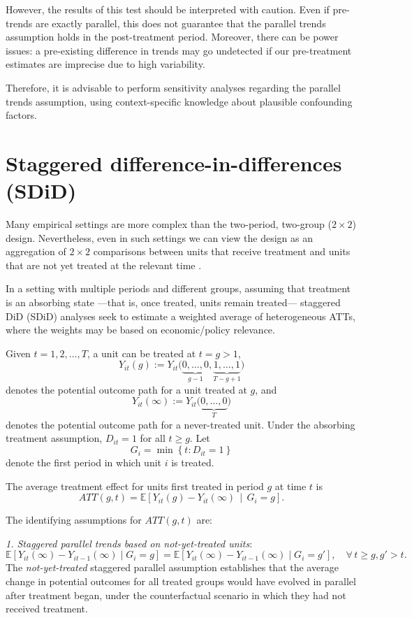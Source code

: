 However, the results of this test should be interpreted with caution. Even if pre-trends are exactly parallel, this does not guarantee that the parallel trends assumption holds in the post-treatment period. Moreover, there can be power issues: a pre-existing difference in trends may go undetected if our pre-treatment estimates are imprecise due to high variability.
  
Therefore, it is advisable to perform sensitivity analyses regarding the parallel trends assumption, using context-specific knowledge about plausible confounding factors.

\section{Staggered difference-in-differences (SDiD)}\label{chap12_6}
Many empirical settings are more complex than the two-period, two-group ($2\times 2$) design. Nevertheless, even in such settings we can view the design as an aggregation of $2\times 2$ comparisons between units that receive treatment and units that are not yet treated at the relevant time \cite{baker2025did_guide}.

In a setting with multiple periods and different groups, assuming that treatment is an absorbing state —that is, once treated, units remain treated— staggered DiD (SDiD) analyses seek to estimate a weighted average of heterogeneous ATTs, where the weights may be based on economic/policy relevance. 

Given $t = 1, 2, \dots, T$, a unit can be treated at $t = g > 1$,  
\[
Y_{it}(g) := Y_{it}\big(\underbrace{0, \dots, 0}_{g-1}, \underbrace{1, \dots, 1}_{T-g+1}\big)
\]
denotes the potential outcome path for a unit treated at $g$, and
\[
Y_{it}(\infty) := Y_{it}\big(\underbrace{0, \dots, 0}_{T}\big)
\]
denotes the potential outcome path for a never-treated unit.  
Under the absorbing treatment assumption, $D_{it} = 1$ for all $t \geq g$. Let
\[
G_i = \min\left\{ t : D_{it} = 1 \right\}
\]
denote the first period in which unit $i$ is treated.

The average treatment effect for units first treated in period $g$ at time $t$ is
\[
ATT(g,t) = \mathbb{E}\left[ Y_{it}(g) - Y_{it}(\infty) \,\middle|\, G_i = g \right].
\]

The identifying assumptions for $ATT(g,t)$ are:

\textit{1. Staggered parallel trends based on not-yet-treated units}:
\begin{equation}
	\mathbb{E}[Y_{it}(\infty) - Y_{it-1}(\infty) \mid G_i = g] 
	= \mathbb{E}[Y_{it}(\infty) - Y_{it-1}(\infty) \mid G_i = g'], \quad \forall\, t \geq g, g'>t.
\end{equation}
The \textit{not-yet-treated} staggered parallel assumption establishes that the average change in potential outcomes for all treated groups would have evolved in parallel after treatment began, under the counterfactual scenario in which they had not received treatment.

